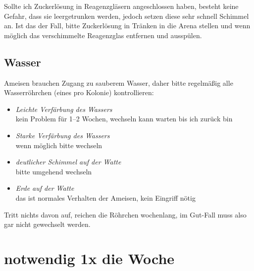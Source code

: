 Sollte ich Zuckerlösung in Reagenzgläsern angeschlossen haben,
besteht keine Gefahr, dass sie leergetrunken werden, jedoch setzen diese sehr schnell Schimmel an.
Ist das der Fall, bitte Zuckerlösung in Tränken in die Arena stellen und
wenn möglich das verschimmelte Reagenzglas entfernen und ausspülen.

\subsection{Wasser}\label{sec:Ameisen_sub:Wasser}
Ameisen brauchen Zugang zu sauberem Wasser, daher bitte regelmäßig alle Wasserröhrchen
(eines pro Kolonie) kontrollieren:

\begin{itemize}
  \item\textit{Leichte Verfärbung des Wassers} \\
  kein Problem für 1--2 Wochen, wechseln kann warten bis ich zurück bin
  \item\textit{Starke Verfärbung des Wassers} \\
  wenn möglich bitte wechseln
  \item\textit{deutlicher Schimmel auf der Watte} \\
  bitte umgehend wechseln
  \item\textit{Erde auf der Watte} \\
  das ist normales Verhalten der Ameisen, kein Eingriff nötig
\end{itemize}

Tritt nichts davon auf, reichen die Röhrchen wochenlang, im Gut-Fall muss also gar nicht gewechselt werden.

\section{notwendig 1x die Woche}

